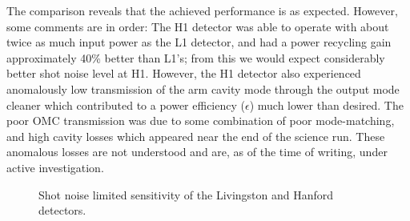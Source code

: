 The comparison reveals that the achieved performance is as expected.  However,
some comments are in order: The H1 detector was able to operate with about twice
as much input power as the L1 detector, and had a power recycling gain
approximately 40\% better than L1's; from this we would expect considerably
better shot noise level at H1.  However, the H1 detector also experienced
anomalously low transmission of the arm cavity mode through the output mode
cleaner which contributed to a power efficiency ($\epsilon$) much lower than
desired.  The poor OMC transmission was due to some combination of poor
mode-matching, and high cavity losses which appeared near the end of the science
run.  These anomalous losses are not understood and are, as of the time of
writing, under active investigation.  

\begin{figure}
\caption{\label{fig:shot-noise-limited-sensitivity}Shot noise limited sensitivity of the Livingston and Hanford detectors.}
\end{figure}



